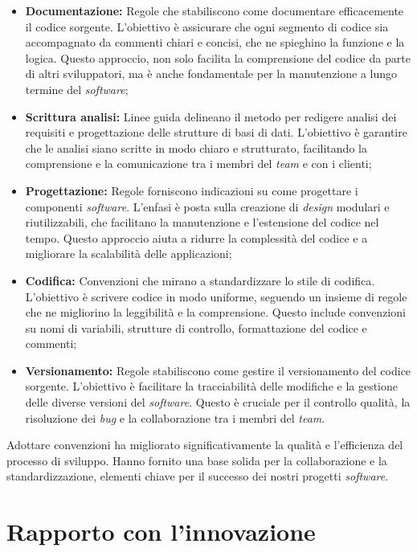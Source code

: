 \begin{itemize}
\item \textbf{Documentazione:} Regole che stabiliscono come documentare efficacemente il codice sorgente. 
L'obiettivo è assicurare che ogni segmento di codice sia accompagnato da commenti chiari e concisi, che ne spieghino la funzione e la logica. 
Questo approccio, non solo facilita la comprensione del codice da parte di altri sviluppatori, ma è anche fondamentale per la manutenzione a lungo termine del \textit{software};

\item \textbf{Scrittura analisi:} Linee guida delineano il metodo per redigere analisi dei requisiti e progettazione delle strutture di basi di dati. 
L'obiettivo è garantire che le analisi siano scritte in modo chiaro e strutturato, facilitando la comprensione e la comunicazione tra i membri del \textit{team} e con i clienti;

\item \textbf{Progettazione:} Regole forniscono indicazioni su come progettare i componenti \textit{software}. 
L'enfasi è posta sulla creazione di \textit{design} modulari e riutilizzabili, che facilitano la manutenzione e l'estensione del codice nel tempo. 
Questo approccio aiuta a ridurre la complessità del codice e a migliorare la scalabilità delle applicazioni;

\item \textbf{Codifica:} Convenzioni che mirano a standardizzare lo stile di codifica. L'obiettivo è scrivere codice in modo uniforme, seguendo un insieme di regole che ne migliorino la leggibilità e la comprensione. Questo include convenzioni su nomi di variabili, strutture di controllo, formattazione del codice e commenti;

\item \textbf{Versionamento:} Regole stabiliscono come gestire il versionamento del codice sorgente. 
L'obiettivo è facilitare la tracciabilità delle modifiche e la gestione delle diverse versioni del \textit{software}. 
Questo è cruciale per il controllo qualità, la risoluzione dei \textit{bug} e la collaborazione tra i membri del \textit{team}.
\end{itemize}

Adottare convenzioni ha migliorato significativamente la qualità e l'efficienza del processo di sviluppo. Hanno fornito una base solida per la collaborazione e la standardizzazione, elementi chiave per il successo dei nostri progetti \textit{software}.
\newpage\section{Rapporto con l'innovazione}

